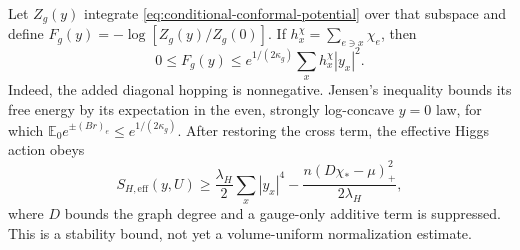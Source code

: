 \documentclass[11pt,a4paper,oneside]{book}
\theoremstyle{plain}
\theoremstyle{definition}
\theoremstyle{remark}
\newcommand{\E}{\mathbb E}
\newcommand{\src}[2]{\cite{#1}}
\begin{document}
Let $Z_g(y)$ integrate \eqref{eq:conditional-conformal-potential} over
that subspace and define $F_g(y)=-\log[Z_g(y)/Z_g(0)]$.  If
$h_x^\chi=\sum_{e\ni x}\chi_e$, then
\begin{equation}
 0\le F_g(y)\le e^{1/(2\kappa_g)}
                         \sum_xh_x^\chi|y_x|^2.
 \label{eq:conformal-free-energy-bound}
\end{equation}
Indeed, the added diagonal hopping is nonnegative.  Jensen's inequality
bounds its free energy by its expectation in the even, strongly
log-concave $y=0$ law, for which
$\E_0e^{\pm(Br)_e}\le e^{1/(2\kappa_g)}$.
After restoring the cross term, the effective Higgs action obeys
\begin{equation}
 S_{H,\mathrm{eff}}(y,U)
 \ge\frac{\lambda_H}{2}\sum_x|y_x|^4
       -\frac{n(D\chi_*-\mu)_+^2}{2\lambda_H},
 \label{eq:effective-higgs-stability}
\end{equation}
where $D$ bounds the graph degree and a gauge-only additive term is
suppressed.  This is a stability bound, not yet a volume-uniform
normalization estimate.  \src{R17}{thm:v17v39-free,thm:v17v39-coercive}
\end{document}
